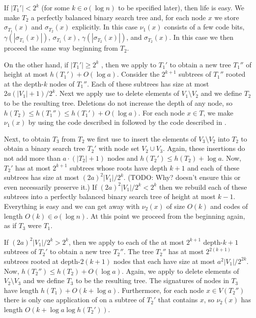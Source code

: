 \documentclass[kpfonts]{patmorin}
\begin{document}
If $|T_1'|<2^k$ (for some $k\in o(\log n)$ to be specified later), then life is easy.  We make $T_2$ a perfectly balanced binary search tree and, for each node $x$ we store $\sigma_{T_1}(x)$ and $\sigma_{T_2}(x)$ explicitly.  In this case $\nu_1(x)$ consists of a few code bits, $\gamma(|\sigma_{T_1}(x)|)$, $\sigma_{T_1}(x)$, $\gamma(|\sigma_{T_2}(x)|)$, and $\sigma_{T_2}(x)$.  In this case we then proceed the same way beginning from $T_2$.

On the other hand, if $|T_1'|\ge 2^k$ , then we apply  to $T_1'$ to obtain a new tree $T_1''$ of height at most $h(T_1')+O(\log a)$.  Consider the $2^{k+1}$ subtrees of $T_1''$ rooted at the depth-$k$ nodes of $T_1''$.  Each of these subtrees has size at most $2a(|V_1|+1)/2^k$.  Next we apply use  to delete elements of $V_1\setminus V_2$ and we define $T_2$ to be the resulting tree.  Deletions do not increase the depth of any node, so $h(T_2)\le h(T_1'')\le h(T_1')+O(\log a)$.  For each node $x\in T$, we make $\nu_1(x)$ by using the code described in  followed by the code described in .

Next, to obtain $T_3$ from $T_2$ we first use  to insert the elements of $V_3\setminus V_2$ into $T_2$ to obtain a binary search tree $T_2'$ with node set $V_2\cup V_3$.   Again, these insertions do not add more than $a\cdot(|T_2|+1)$ nodes and $h(T_2')\le h(T_2)+\log a$.  Now, $T_2'$ has at most $2^{k+1}$ subtrees whose roots have depth $k+1$ and each of these subtrees has size at most $(2a)^2|V_1|/2^k$. (TODO: Why?  doesn't ensure this or even necessarily preserve it.)  If $(2a)^2|V_1|/2^k < 2^k$ then we rebuild each of these subtrees into a perfectly balanced binary search tree of height at most $k-1$.  Everything is easy and we can get away with $\nu_2(x)$ of size $O(k)$ and codes of length $O(k)\in o(\log n)$.  At this point we proceed from the beginning again, as if $T_3$ were $T_1$.

If $(2a)^2|V_1|/2^k > 2^k$, then we apply  to each of the at most $2^{k+1}$ depth-$k+1$ subtrees of $T_2'$ to obtain a new tree $T_2''$.  The tree $T_2''$ has at most $2^{2(k+1)}$ subtrees rooted at depth-$2(k+1)$ nodes that each have size at most $a^2|V_1|/2^{2k}$. Now, $h(T_2'')\le h(T_2)+O(\log a)$. Again, we apply  to delete elements of $V_2\setminus V_3$ and we define $T_3$ to be the resulting tree.  The signatures of nodes in $T_3$ have length $h(T_1)+O(k+\log a)$.  Furthermore, for each node $x\in V(T_2'')$ there is only one application of  on a subtree of $T_2'$ that contains $x$, so $\nu_2(x)$ has length $O(k+\log a\log h(T_2'))$.
\end{document}
